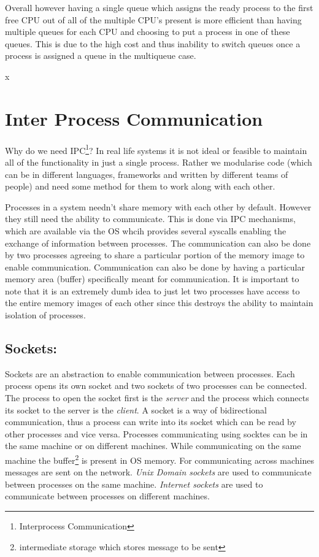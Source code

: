 \documentclass[12pt]{article}
\begin{document}
Overall however having
a single queue which assigns the ready process to the first free CPU out of all of the multiple CPU's present is more efficient than having
multiple queues for each CPU and choosing to put a process in one of these queues. This is due to the high cost and thus inability to switch queues once a process
is assigned a queue in the multiqueue case.

x
\section{Inter Process Communication}
Why do we need IPC\footnote{Interprocess Communication}? In real life systems it is not ideal or feasible to maintain all of the functionality in just a single
process. Rather we 
modularise code (which can be in different languages, frameworks and written by different teams of people) and need some method for them to work along with each other.

Processes in a system needn't share memory with each other by default. However they still need the ability to communicate. This is done via
IPC mechanisms, which are available via the OS whcih provides several syscalls enabling the exchange of information between processes. The communication can also
be done by two processes agreeing to share a particular portion of the memory image to enable communication. Communication can also be done by having a particular
memory area (buffer) specifically meant for communication. It is important to note that it is an extremely dumb idea to just let two processes have access to the entire 
memory images of each other since this destroys the ability to maintain isolation of processes.   


\subsection{Sockets:}
Sockets are an abstraction to enable communication between processes. Each process opens its own socket and two sockets of two processes can be connected.
The process to open the socket first is the \textit{server} and the process which connects its socket to the server is the \textit{client}. A socket is a way of 
bidirectional communication, thus a process can write into its socket which can be read by other processes and vice versa. Processes communicating using socktes can be 
in the same machine or on different machines. While communicating on the same machine the buffer\footnote{intermediate storage which stores message to be sent} is present in OS memory. For communicating across machines messages are sent on the network.
\textit{Unix Domain sockets} are used to communicate between processes on the same machine. \textit{Internet sockets} are used to communicate between
processes on different machines. 
\end{document}
